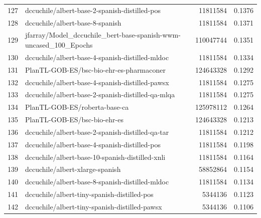 {\begin{xltabular}{\textwidth}{l X rc}
    127              & dccuchile/albert-base-2-spanish-distilled-pos                              & 11811584      & 0.1376       \\
    128              & dccuchile/albert-base-8-spanish                                            & 11811584      & 0.1371       \\
    129              & jfarray/Model\_dccuchile\_bert-base-spanish-wwm-uncased\_100\_Epochs       & 110047744     & 0.1351       \\
    130              & dccuchile/albert-base-4-spanish-distilled-mldoc                            & 11811584      & 0.1334       \\
    131              & PlanTL-GOB-ES/bsc-bio-ehr-es-pharmaconer                                   & 124643328     & 0.1292       \\
    132              & dccuchile/albert-base-4-spanish-distilled-pawsx                            & 11811584      & 0.1275       \\
    133              & dccuchile/albert-base-2-spanish-distilled-qa-mlqa                          & 11811584      & 0.1275       \\
    134              & PlanTL-GOB-ES/roberta-base-ca                                              & 125978112     & 0.1264       \\
    135              & PlanTL-GOB-ES/bsc-bio-ehr-es                                               & 124643328     & 0.1213       \\
    136              & dccuchile/albert-base-2-spanish-distilled-qa-tar                           & 11811584      & 0.1212       \\
    137              & dccuchile/albert-base-4-spanish-distilled-pos                              & 11811584      & 0.1198       \\
    138              & dccuchile/albert-base-10-spanish-distilled-xnli                            & 11811584      & 0.1164       \\
    139              & dccuchile/albert-xlarge-spanish                                            & 58852864      & 0.1154       \\
    140              & dccuchile/albert-base-8-spanish-distilled-mldoc                            & 11811584      & 0.1134       \\
    141              & dccuchile/albert-tiny-spanish-distilled-pos                                & 5344136       & 0.1123       \\
    142              & dccuchile/albert-tiny-spanish-distilled-pawsx                              & 5344136       & 0.1106       \\

\end{xltabular}}

